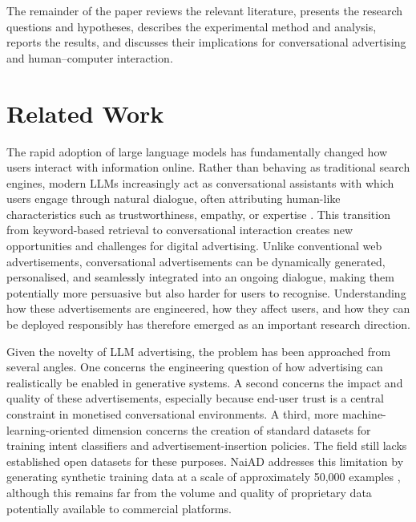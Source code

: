 \documentclass[english]{article}
\begin{document}
The remainder of the paper reviews the relevant literature, presents the research
questions and hypotheses, describes the experimental method and analysis, reports
the results, and discusses their implications for conversational advertising and
human--computer interaction.



\section{Related Work}
\label{sec:related-work}
\color{black}

The rapid adoption of large language models has fundamentally changed how users
interact with information online. Rather than behaving as traditional search
engines, modern LLMs increasingly act as conversational assistants with which users
engage through natural dialogue, often attributing human-like characteristics such
as trustworthiness, empathy, or expertise \cite{rainie2025llmusers}. This transition
from keyword-based retrieval to conversational interaction creates new
opportunities and challenges for digital advertising. Unlike conventional web
advertisements, conversational advertisements can be dynamically generated,
personalised, and seamlessly integrated into an ongoing dialogue, making them
potentially more persuasive but also harder for users to recognise. Understanding
how these advertisements are engineered, how they affect users, and how they can be
deployed responsibly has therefore emerged as an important research direction.

Given the novelty of LLM advertising, the problem has been approached from several
angles. One concerns the engineering question of how advertising can realistically
be enabled in generative systems. A second concerns the impact and quality of these
advertisements, especially because end-user trust is a central constraint in
monetised conversational environments. A third, more machine-learning-oriented
dimension concerns the creation of standard datasets for training intent
classifiers and advertisement-insertion policies. The field still lacks established
open datasets for these purposes. NaiAD addresses this limitation by generating
synthetic training data at a scale of approximately 50,000 examples
\cite{zhang2026naiad}, although this remains far from the volume and quality of
proprietary data potentially available to commercial platforms.
\end{document}
